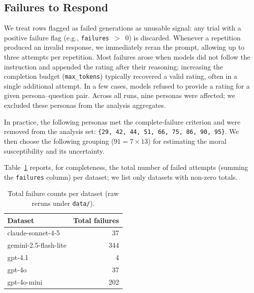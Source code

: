 \documentclass{article}
\begin{document}
\subsection{Failures to Respond}
\label{sec:failures}
We treat rows flagged as failed generations as unusable signal: any trial with a positive failure flag (e.g., \texttt{failures}~$>$~0) is discarded. Whenever a repetition produced an invalid response, we immediately reran the prompt, allowing up to three attempts per repetition. Most failures arose when models did not follow the instruction and appended the rating after their reasoning; increasing the completion budget (\texttt{max\_tokens}) typically recovered a valid rating, often in a single additional attempt. In a few cases, models refused to provide a rating for a given persona--question pair. Across all runs, nine personas were affected; we excluded these personas from the analysis aggregates.

In practice, the following personas met the complete-failure criterion and were removed from the analysis set: \texttt{\{29, 42, 44, 51, 66, 75, 86, 90, 95\}}. We then choose the following grouping (\(91 = 7 \times 13\)) for estimating the moral susceptibility and its uncertainty.

Table~\ref{tab:failures_by_model} reports, for completeness, the total number of failed attempts (summing the \texttt{failures} column) per dataset; we list only datasets with non-zero totals.

\begin{table}[t]
  \centering
  \caption{Total failure counts per dataset (raw reruns under \texttt{data/}).}
  \label{tab:failures_by_model}
  \begin{tabular}{lr}
    \toprule
    Dataset & Total failures \\
    \midrule
    claude-sonnet-4-5      & 37  \\
    gemini-2.5-flash-lite  & 344 \\
    gpt-4.1                & 4   \\
    gpt-4o                 & 37  \\
    gpt-4o-mini            & 202 \\
    \bottomrule
  \end{tabular}
\end{table}
\end{document}
